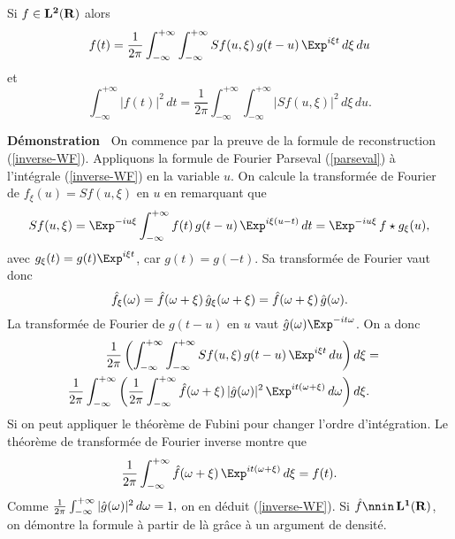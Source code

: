 \begin{theorem}
\label{window-four-form}
\label{formual-WF}
Si $f \in {\bf L ^ 2 ({\bf{R}})}$ 
alors
\begin{equation}
\label{inverse-WF}
f(t) = \frac 1 {2 \pi} \int_{-\infty}^{+\infty}  \int_{-\infty}^{+\infty} 
Sf(u,\xi) \,g(t-u) \,\Exp^{i \xi t} \, d\xi \, du 
\end{equation}
et 
\begin{equation}
\label{energy-WF}
\int_{-\infty}^{+\infty} |f(t)|^2 \,dt = 
\frac 1 {2 \pi} \int_{-\infty}^{+\infty}  \int_{-\infty}^{+\infty} 
|S f(u,\xi)|^2 \, d\xi \, du .
\end{equation}
\end{theorem}

{\bf D\'emonstration\ }
On commence par la preuve de la formule de reconstruction 
(\ref{inverse-WF}). Appliquons la formule de Fourier Parseval 
(\ref{parseval}) \`{a} l'int\'{e}grale (\ref{inverse-WF}) en la 
variable $u$. On calcule la transform\'{e}e de Fourier de 
$f_\xi (u) = Sf(u,\xi)$ en $u$ en remarquant que
\begin{equation}
\label{wind-filt}
Sf(u,\xi) = \Exp^{-iu\xi} 
\int_{- \infty}^{+ \infty} f(t) \,g(t-u)\, \Exp^{i \xi (u-t)}\, dt
= \Exp^{-iu\xi} \,f \star g_\xi (u) ,
\end{equation}
avec $g_\xi	(t)	= g(t) \Exp^{i \xi t}$, car $g(t) =	g(-t)$. Sa 
transform\'{e}e de Fourier vaut donc
\[
\hat f_\xi ({\omega}) = \hat f({\omega} + \xi) \,\hat g_\xi ({\omega} + \xi) = 
\hat f({\omega} + \xi)\, \hat g( {\omega} ) .
\]
La transform\'{e}e de Fourier de $g(t-u)$ en $u$ vaut 
$\hat	g(\om) \Exp^{-it\om}$. On a donc
\begin{eqnarray*}
\frac 1 {2 \pi} \left( \int_{-\infty}^{+\infty}  
\int_{-\infty}^{+\infty} Sf(u,\xi) \,g(t-u) \,
\Exp^{i \xi t}\,  du \right) d\xi & = & \\
\frac 1 {2 \pi} \int_{-\infty}^{+\infty}  \left(
\frac 1 {2 \pi} \int_{-\infty}^{+\infty}  
\hat f(\om+\xi)\, |\hat g(\om)|^2\, \Exp^{it(\om+\xi)}\, d \om \right)  d\xi &  . &
\end{eqnarray*}
Si  on peut appliquer le th\'{e}or\`{e}me de Fubini pour 
changer l'ordre d'int\'{e}gration. Le th\'{e}or\`{e}me de 
transform\'{e}e de Fourier inverse montre que
\[
\frac 1 {2 \pi} \int_{-\infty}^{+\infty}  
\hat f(\om + \xi) \,\Exp^{it(\om+\xi)}\,  d\xi = f(t) .
\]
Comme
$\frac 1 {2 \pi} \int_{-\infty}^{+\infty}  
|\hat g({\omega})|^2\,  d{\omega}  = 1,$
on en d\'{e}duit (\ref{inverse-WF}). Si $\hat	f \nnin	\,\LU$,
on d\'{e}montre la formule \`{a} partir de l\`{a} gr\^{a}ce \`{a}
un argument de densit\'{e}.

